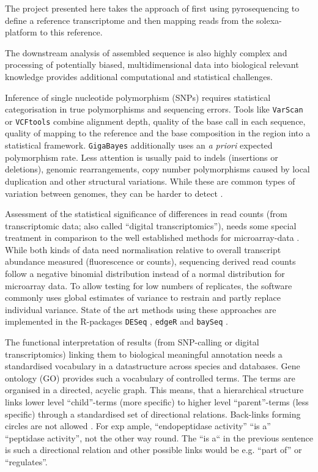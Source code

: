 The project presented here takes the approach of first using
pyrosequencing to define a reference transcriptome and then mapping
reads from the solexa-platform to this reference.

The downstream analysis of assembled sequence is also highly complex
and processing of potentially biased, multidimensional data into
biological relevant knowledge provides additional computational and
statistical challenges.

Inference of single nucleotide polymorphism (SNPs) requires
statistical categorisation in true polymorphisms and sequencing
errors. Tools like \texttt{VarScan} \cite{pmid19542151} or
\texttt{VCFtools} \cite{pmid21653522} combine alignment depth, quality
of the base call in each sequence, quality of mapping to the reference
and the base composition in the region into a statistical
framework. \texttt{GigaBayes} \cite{pmid18204455} additionally uses an
\textit{a priori} expected polymorphism rate. Less attention is
usually paid to indels (insertions or deletions), genomic
rearrangements, copy number polymorphisms caused by local duplication
and other structural variations. While these are common types of
variation between genomes, they can be harder to detect
\cite{pmid22084086}.

Assessment of the statistical significance of differences in read counts
(from transcriptomic data; also called ``digital transcriptomics''),
needs some special treatment in comparison to the well established
methods for microarray-data \cite{smyth2005limma}. While both kinds of
data need normalisation relative to overall transcript abundance
measured (fluorescence or counts), sequencing derived read counts
follow a negative binomial distribution \cite{pmid17728317} instead of
a normal distribution for microarray data. To allow testing for low
numbers of replicates, the software commonly uses global estimates of
variance to restrain and partly replace individual variance. State of
the art methods using these approaches are implemented in the
R-packages \texttt{DESeq} \cite{pmid20979621}, \texttt{edgeR}
\cite{pmid19910308} and \texttt{baySeq} \cite{pmid20698981}.

The functional interpretation of results (from SNP-calling or digital
transcriptomics) linking them to biological meaningful annotation
needs a standardised vocabulary in a datastructure across species and
databases. Gene ontology (GO) provides such a vocabulary of controlled
terms. The terms are organised in a directed, acyclic graph. This
means, that a hierarchical structure links lower level ``child''-terms
(more specific) to higher level ``parent''-terms (less specific)
through a standardised set of directional relations. Back-links
forming circles are not allowed \cite{pmid10802651,pmid22123736}. For
exp ample, ``endopeptidase activity'' ``is a'' ``peptidase activity'',
not the other way round. The ``is a`` in the previous sentence is such
a directional relation and other possible links would be e.g. ``part
of'' or ``regulates''.


